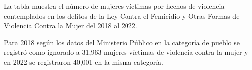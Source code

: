 La tabla muestra el número de mujeres víctimas por hechos de violencia contemplados en los delitos de la Ley Contra el Femicidio y Otras Formas de Violencia Contra la Mujer del 2018 al 2022. 

Para 2018 según los datos del Ministerio Público en la categoría de pueblo se registró como ignorado a 31,963 mujeres víctimas de violencia contra la mujer y en 2022 se registraron 40,001 en la misma categoría. 